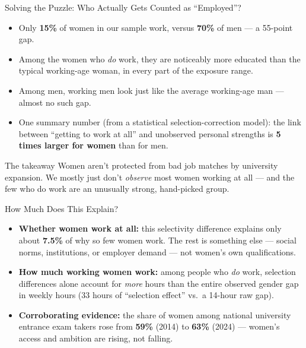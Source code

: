 \documentclass[aspectratio=169,11pt]{beamer}
\begin{document}
\begin{frame}{Solving the Puzzle: Who Actually Gets Counted as ``Employed''?}
\begin{itemize}
\item Only \textbf{15\%} of women in our sample work, versus \textbf{70\%} of men --- a 55-point gap.
\medskip
\item Among the women who \emph{do} work, they are noticeably more educated than the typical working-age woman, in every part of the exposure range.
\item Among men, working men look just like the average working-age man --- almost no such gap.
\medskip
\item One summary number (from a statistical selection-correction model): the link between ``getting to work at all'' and unobserved personal strengths is \textbf{5 times larger for women} than for men.
\end{itemize}
\begin{block}{The takeaway}
Women aren't protected from bad job matches by university expansion. We mostly just don't \emph{observe} most women working at all --- and the few who do work are an unusually strong, hand-picked group.
\end{block}
\end{frame}

\begin{frame}[c]{How Much Does This Explain?}
\begin{itemize}
\item \textbf{Whether women work at all:} this selectivity difference explains only about \textbf{7.5\%} of why so few women work. The rest is something else --- social norms, institutions, or employer demand --- not women's own qualifications.
\medskip
\item \textbf{How much working women work:} among people who \emph{do} work, selection differences alone account for \emph{more} hours than the entire observed gender gap in weekly hours (33 hours of ``selection effect'' vs.\ a 14-hour raw gap).
\medskip
\item \textbf{Corroborating evidence:} the share of women among national university entrance exam takers rose from \textbf{59\%} (2014) to \textbf{63\%} (2024) --- women's access and ambition are rising, not falling.
\end{itemize}
\end{frame}
\end{document}
